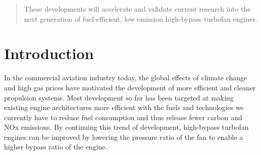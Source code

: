 \documentclass[conf]{new-aiaa}
\begin{document}
\begin{abstract}
	These developments will accelerate and validate current research into the next generation of fuel-efficient, low emission high-bypass turbofan engines.
\end{abstract}

\section{Introduction}
In the commercial aviation industry today, the global effects of climate change and high gas prices have motivated the development of more efficient and cleaner propulsion systems.
Most development so far has been targeted at making existing engine architectures more efficient with the fuels and technologies we currently have to reduce fuel consumption and thus release fewer carbon and NOx emissions.
By continuing this trend of development, high-bypass turbofan engines can be improved by lowering the pressure ratio of the fan to enable a higher bypass ratio of the engine.
\end{document}
